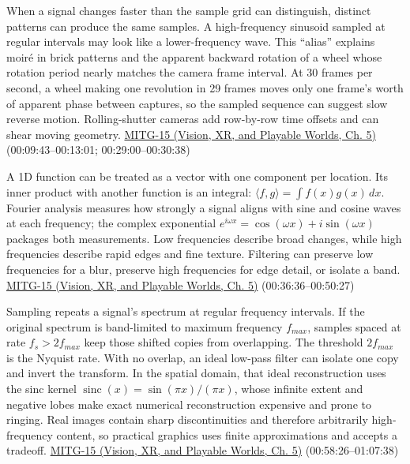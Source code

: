 When a signal changes faster than the sample grid can distinguish, distinct patterns can produce the same samples. A high-frequency sinusoid sampled at regular intervals may look like a lower-frequency wave. This ``alias'' explains moiré in brick patterns and the apparent backward rotation of a wheel whose rotation period nearly matches the camera frame interval. At 30 frames per second, a wheel making one revolution in 29 frames moves only one frame's worth of apparent phase between captures, so the sampled sequence can suggest slow reverse motion. Rolling-shutter cameras add row-by-row time offsets and can shear moving geometry. \href{../07-Vision-XR-and-Playable-Worlds/main.pdf\#nameddest=04-visual-computing-ii-ch036-mitg-15---antialiasing}{MITG-15 (Vision, XR, and Playable Worlds, Ch. 5)} (00:09:43--00:13:01; 00:29:00--00:30:38)

A 1D function can be treated as a vector with one component per location. Its inner product with another function is an integral: \(\langle f,g\rangle=\int f(x)g(x)\,dx\). Fourier analysis measures how strongly a signal aligns with sine and cosine waves at each frequency; the complex exponential \(e^{i\omega x}=\cos(\omega x)+i\sin(\omega x)\) packages both measurements. Low frequencies describe broad changes, while high frequencies describe rapid edges and fine texture. Filtering can preserve low frequencies for a blur, preserve high frequencies for edge detail, or isolate a band. \href{../07-Vision-XR-and-Playable-Worlds/main.pdf\#nameddest=04-visual-computing-ii-ch036-mitg-15---antialiasing}{MITG-15 (Vision, XR, and Playable Worlds, Ch. 5)} (00:36:36--00:50:27)

Sampling repeats a signal's spectrum at regular frequency intervals. If the original spectrum is band-limited to maximum frequency \(f_{max}\), samples spaced at rate \(f_s>2f_{max}\) keep those shifted copies from overlapping. The threshold \(2f_{max}\) is the Nyquist rate. With no overlap, an ideal low-pass filter can isolate one copy and invert the transform. In the spatial domain, that ideal reconstruction uses the sinc kernel \(\operatorname{sinc}(x)=\sin(\pi x)/(\pi x)\), whose infinite extent and negative lobes make exact numerical reconstruction expensive and prone to ringing. Real images contain sharp discontinuities and therefore arbitrarily high-frequency content, so practical graphics uses finite approximations and accepts a tradeoff. \href{../07-Vision-XR-and-Playable-Worlds/main.pdf\#nameddest=04-visual-computing-ii-ch036-mitg-15---antialiasing}{MITG-15 (Vision, XR, and Playable Worlds, Ch. 5)} (00:58:26--01:07:38)

